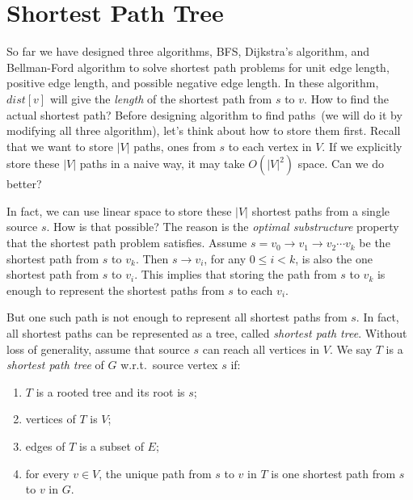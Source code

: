 \setcounter{definition}{0} \setcounter{property}{0} \setcounter{claim}{0} \setcounter{fact}{0} \setcounter{corollary}{0} \setcounter{figure}{0}
\section{Shortest Path Tree}

So far we have designed three algorithms, BFS, Dijkstra's algorithm, and Bellman-Ford algorithm
to solve shortest path problems for unit edge length, positive edge length, and possible negative edge length.
In these algorithm, $dist[v]$ will give the \emph{length} of the
shortest path from $s$ to $v$. How to find the actual shortest path?
Before designing algorithm to find paths~(we will do it by modifying all three algorithm),
let's think about how to store them first.
Recall that we want to store $|V|$ paths, ones from $s$ to each vertex in $V$.
If we explicitly store these $|V|$ paths in a naive way, it may take $O(|V|^2)$ space.
Can we do better?

In fact, we can use linear space to store these $|V|$ shortest paths from a single source $s$.
How is that possible? The reason is the \emph{optimal substructure} property that the shortest path problem satisfies.
Assume $s = v_0 \to v_1 \to v_2\cdots v_k$ be the shortest path from $s$ to $v_k$. Then $s \to v_i$, for any $0 \le i < k$,
is also the one shortest path from $s$ to $v_i$. This implies that storing the path from $s$ to $v_k$ is enough to
represent the shortest paths from $s$ to each $v_i$. 

But one such path is not enough to represent all shortest paths from $s$. In fact, all shortest paths
can be represented as a tree, called \emph{shortest path tree}.
Without loss of generality, assume that source $s$ can reach all vertices in $V$.
We say $T$ is a \emph{shortest path tree} of $G$ w.r.t.\ source vertex $s$ if:
\vspace*{-\topsep}
\begin{enumerate}
\item $T$ is a rooted tree and its root is $s$;
\item vertices of $T$ is $V$;
\item edges of $T$ is a subset of $E$;
\item for every $v\in V$, the unique path from $s$ to $v$ in $T$ is one shortest path from $s$ to $v$ in $G$.
\end{enumerate}

